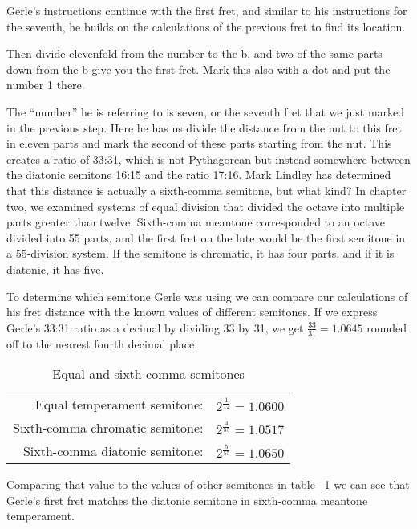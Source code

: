 Gerle's instructions continue with the first fret, and similar to his instructions for the
seventh, he builds on the calculations of the previous fret to find its location.
\begin{blocks}
Then divide elevenfold from the number to the b, and two of the same parts down from the b
give you the first fret. Mark this also with a dot and put the number 1 there.
\end{blocks}
The ``number'' he is referring to is seven, or the seventh fret that we just marked in the
previous step. Here he has us divide the distance from the nut to this fret in eleven
parts and mark the second of these parts starting from the nut. This creates a ratio of
33:31, which is not Pythagorean but instead somewhere between the diatonic semitone
16:15 and the ratio 17:16. Mark Lindley has determined that this distance is actually a
sixth-comma semitone, but what kind? In chapter two, we examined systems of equal
division that divided the octave into multiple parts greater than twelve. Sixth-comma
meantone corresponded to an octave divided into 55 parts, and the first fret on the lute
would be the first semitone in a 55-division system. If the semitone is chromatic, 
it has four parts, and if it is diatonic, it has five.

To determine which semitone Gerle was using we can compare our calculations of his fret
distance with the known values of different semitones. If we express Gerle's 33:31 ratio
as a decimal by dividing 33 by 31, we get $ \frac{33}{31} = 1.0645 $ rounded off
to the nearest fourth decimal place.
\begin{table}[h!]
  \begin{center}
  \begin{tabular}{ r l }
    Equal temperament semitone:   & $ 2^\frac{1}{12} = 1.0600 $ \\
    Sixth-comma chromatic semitone: & $ 2^\frac{4}{55} = 1.0517 $ \\
    Sixth-comma diatonic semitone: & $ 2^\frac{5}{55} = 1.0650 $ \\
  \end{tabular}
  \end{center}
  \caption{Equal and sixth-comma semitones}
  \label{table:6semitones}
\end{table}
Comparing that value to the values of other semitones in table ~\ref{table:6semitones}
we can see that Gerle's first fret matches the diatonic semitone in sixth-comma
meantone temperament.

